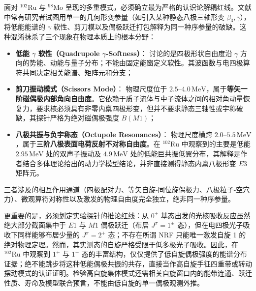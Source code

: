 面对 $^{102}\mathrm{Ru}$ 与 $^{98}\mathrm{Mo}$ 呈现的多重模式，必须确立最为严格的认识论解耦红线。文献中常有研究者试图用单一的几何形变参量（如引入某种静态八极三轴形变 $\beta_3, \gamma$），将低能能谱的 $\gamma$ 软性、剪刀模以及偶极跃迁打包解释为同一种序参量的破缺。这种混淆抹杀了三个现象在物理本质上的根本分野：
\begin{itemize}
\item \textbf{低能 $\gamma$ 软性（Quadrupole $\gamma$-Softness）}：
  讨论的是四极形状自由度沿 $\gamma$ 方向的势能、动能与量子分布；不能由固定能窗定义软性。其波函数与电四极算符共同决定相关能谱、矩阵元和分支；
\item \textbf{剪刀振动模式（Scissors Mode）}：
  物理尺度位于 $2.5\text{--}4.0\,\mathrm{MeV}$，属于\textbf{等矢一阶磁偶极内部角向自由度}。它依赖于质子流体与中子流体之间的相对角动量恢复力，要求核必须具有非零内禀四极形变，但并不要求静态三轴性或宇称破缺，其探针严格为绝对磁偶极强度 $B(M1)$；
\item \textbf{八极共振与负宇称态（Octupole Resonances）}：
  物理尺度横跨 $2.0\text{--}5.5\,\mathrm{MeV}$，属于\textbf{三阶八极表面电荷反射不对称自由度}。在 $^{102}\mathrm{Ru}$ 中观察到的主要是低能 $2.95\,\mathrm{MeV}$ 处的双声子振动及 $4.9\,\mathrm{MeV}$ 处的低能巨共振低翼分布，其解释是作者结合多体理论给出的动力学模型结论，并非直接测得静态内禀八极形变 $E3$ 矩阵元。
\end{itemize}

三者涉及的相互作用通道（四极配对力、等矢自旋-同位旋偶极力、八极粒子-空穴力）、微观算符对称性以及激发的物理自由度完全独立，绝非同一种序参量。

更重要的是，必须划定实验探针的推论红线：从 $0^+$ 基态出发的光核吸收反应虽然绝大部分截面集中于 $E1$ 与 $M1$ 偶极跃迁（布居 $J^\pi = 1^\pm$ 态），但在电四极光子吸收下同样能够布居少量的 $J^\pi = 2^+$ 态；不存在所谓 NRF 只能唯一激发自旋 1 的绝对物理定理。然而，其实测态的自旋严格受限于低多极光子吸收。因此，在 $^{102}\mathrm{Ru}$ 中观察到 $1^+$ 与 $1^-$ 态的丰富结构，仅仅提供了低自旋偶极强度的能谱分布证据；绝不能跳步将这种低能偶极共振的共存，直接当作高自旋手征四重带或转动摆动模式的认证证明。检验高自旋集体模式还需相关自旋窗口内的能带连通、跃迁性质、寿命及模型联合预言，不能由低自旋的单一偶极观测外推。
